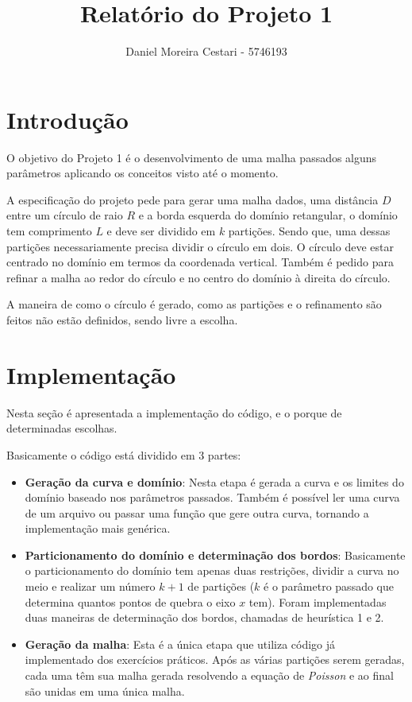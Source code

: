 \documentclass[a4paper]{article}
\title{Relatório do Projeto 1}
\author{Daniel Moreira Cestari - 5746193}
\begin{document}
\maketitle

\section{Introdução}

O objetivo do Projeto 1 é o desenvolvimento de uma malha passados alguns parâmetros aplicando os conceitos visto até o momento.

A especificação do projeto pede para gerar uma malha dados, uma distância $D$ entre um círculo de raio $R$ e a borda esquerda do domínio retangular, o domínio tem comprimento $L$ e deve ser dividido em $k$ partições. Sendo que, uma dessas partições necessariamente precisa dividir o círculo em dois. O círculo deve estar centrado no domínio em termos da coordenada vertical. Também é pedido para refinar a malha ao redor do círculo e no centro do domínio à direita do círculo.

A maneira de como o círculo é gerado, como as partições e o refinamento são feitos não estão definidos, sendo livre a escolha.


\section{Implementação}

Nesta seção é apresentada a implementação do código, e o porque de determinadas escolhas.

Basicamente o código está dividido em 3 partes:
\begin{itemize}
	\item \textbf{Geração da curva e domínio}: Nesta etapa é gerada a curva e os limites do domínio baseado nos parâmetros passados. Também é possível ler uma curva de um arquivo ou passar uma função que gere outra curva, tornando a implementação mais genérica.
	
	\item \textbf{Particionamento do domínio e determinação dos bordos}: Basicamente o particionamento do domínio tem apenas duas restrições, dividir a curva no meio e realizar um número $k+1$ de partições ($k$ é o parâmetro passado que determina quantos pontos de quebra o eixo $x$ tem).
	Foram implementadas duas maneiras de determinação dos bordos, chamadas de heurística 1 e 2.
	
	\item \textbf{Geração da malha}: Esta é a única etapa que utiliza código já implementado dos exercícios práticos. Após as várias partições serem geradas, cada uma têm sua malha gerada resolvendo a equação de \textit{Poisson} e ao final são unidas em uma única malha.
	
\end{itemize}
\end{document}
